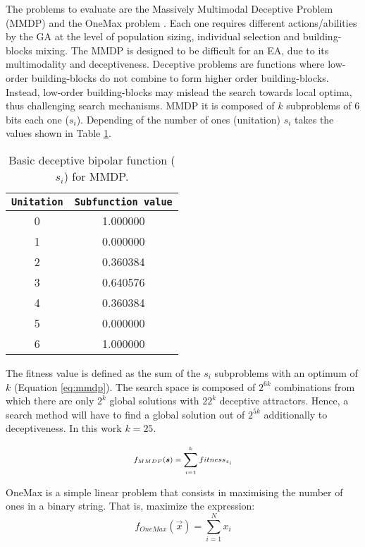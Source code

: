 The problems to evaluate are the Massively Multimodal Deceptive Problem (MMDP) \cite{goldberg92massive} and the OneMax problem \cite{ONEMAX}. Each one requires different actions/abilities by the GA at the level of population sizing, individual selection and building-blocks mixing. The MMDP
 is designed to be difficult for an EA, due to
its multimodality and deceptiveness. Deceptive problems are functions where low-order building-blocks do not combine to form higher order building-blocks. Instead, low-order building-blocks may mislead the search towards local optima, thus challenging search mechanisms. MMDP it is composed of $k$ subproblems of 6 bits each one ($s_i$). Depending of
the number of ones (unitation) $s_i$ takes the values shown in Table \ref{table:mmdpvalues}.  

\begin{table}

\centering
{%
\caption{ Basic deceptive bipolar function ($s_i$) for MMDP.}
\begin{tabular}{|c|c|}
\hline
\texttt{Unitation}&\texttt{Subfunction value}\\
\hline
0 & 1.000000 \\
\hline
1 & 0.000000 \\
\hline
2 & 0.360384 \\
\hline
3 & 0.640576\\
\hline
4 & 0.360384\\
\hline
5 & 0.000000\\
\hline
6 & 1.000000\\
\hline

\end{tabular}
}

\label{table:mmdpvalues}
\end{table}



The fitness value is defined as the sum of the $s_i$ subproblems with an optimum of $k$ (Equation \ref{eq:mmdp}).
The search space is composed of $2^{6k}$ combinations from which there
are only $2^k$ global solutions with $22^k$ deceptive
attractors. Hence, a search method will have to find a global solution
out of $2^{5k}$ additionally to deceptiveness. In this work $k=25$. 

\begin{equation}\label{eq:mmdp}
\scriptsize
f_{MMDP}(\vec s)= \sum_{i=1}^{k} fitness_{s_i}
\end{equation}

OneMax is a simple linear problem that consists in maximising the number of ones in a binary string. That is, maximize the expression:
\begin{equation}
f_{OneMax}(\vec{x}) = \sum_{i=1}^{N}{x_{i}}
\end{equation}

